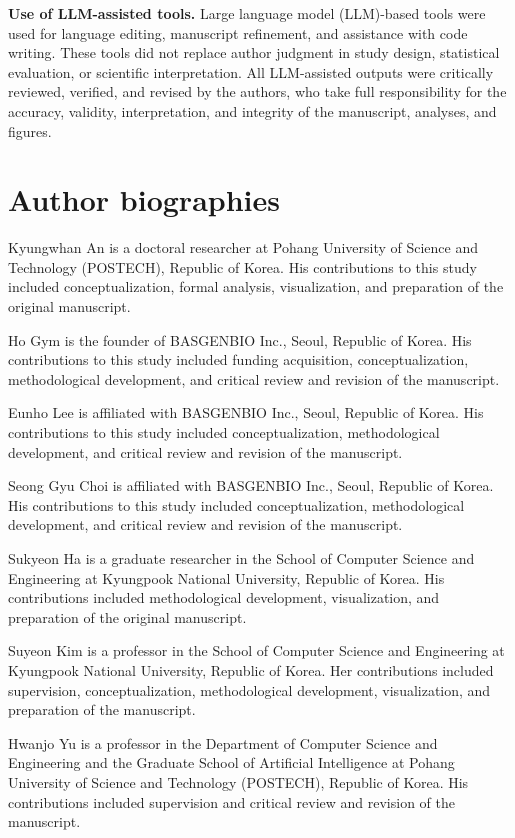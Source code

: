 \documentclass[11pt,a4paper]{article}
\begin{document}
\textbf{Use of LLM-assisted tools.} Large language model (LLM)-based tools were used for language editing, manuscript refinement, and assistance with code writing. These tools did not replace author
judgment in study design, statistical evaluation, or scientific interpretation. All LLM-assisted outputs were critically reviewed, verified, and revised by the authors, who take full responsibility for the accuracy, validity, interpretation, and integrity of the manuscript, analyses, and figures.

\section*{Author biographies}

Kyungwhan An is a doctoral researcher at Pohang University of Science and
Technology (POSTECH), Republic of Korea. His contributions to this study
included conceptualization, formal analysis, visualization, and preparation
of the original manuscript.

Ho Gym is the founder of BASGENBIO Inc., Seoul, Republic of Korea. His
contributions to this study included funding acquisition, conceptualization,
methodological development, and critical review and revision of the manuscript.

Eunho Lee is affiliated with BASGENBIO Inc., Seoul, Republic of Korea. His
contributions to this study included conceptualization, methodological
development, and critical review and revision of the manuscript.

Seong Gyu Choi is affiliated with BASGENBIO Inc., Seoul, Republic of Korea.
His contributions to this study included conceptualization, methodological
development, and critical review and revision of the manuscript.

Sukyeon Ha is a graduate researcher in the School of Computer Science and
Engineering at Kyungpook National University, Republic of Korea. His
contributions included methodological development, visualization, and
preparation of the original manuscript.

Suyeon Kim is a professor in the School of Computer Science and Engineering at
Kyungpook National University, Republic of Korea. Her contributions included
supervision, conceptualization, methodological development, visualization,
and preparation of the manuscript.

Hwanjo Yu is a professor in the Department of Computer Science and Engineering
and the Graduate School of Artificial Intelligence at Pohang University of
Science and Technology (POSTECH), Republic of Korea. His contributions included
supervision and critical review and revision of the manuscript.
\end{document}
